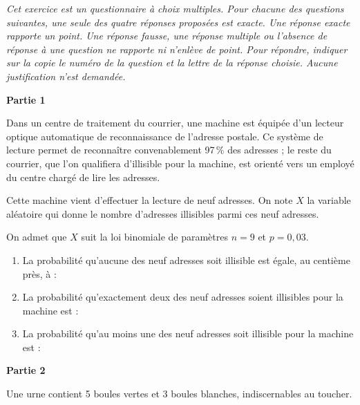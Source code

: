 \emph{Cet exercice est un questionnaire à choix multiples. Pour chacune des questions suivantes, une seule des quatre réponses proposées est exacte. Une réponse exacte rapporte un point. Une réponse fausse, une réponse multiple ou l’absence de réponse à une question ne rapporte ni n’enlève de point. Pour répondre, indiquer sur la copie le numéro de la question et la lettre de la réponse choisie. Aucune justification n’est demandée.}

\medskip

\textbf{Partie 1}

\medskip

Dans un centre de traitement du courrier, une machine est équipée d’un lecteur optique automatique de reconnaissance de l’adresse postale. Ce système de lecture permet de reconnaître convenablement 97\,\% des adresses ; le reste du courrier, que l’on qualifiera d’illisible pour la machine, est orienté vers un employé du centre chargé de lire les adresses.

Cette machine vient d’effectuer la lecture de neuf adresses. On note $X$ la variable aléatoire qui donne le nombre d’adresses illisibles parmi ces neuf adresses. 

On admet que $X$ suit la loi binomiale de paramètres $n=9$ et $p=0,03$.

\begin{enumerate}
	\item La probabilité qu’aucune des neuf adresses soit illisible est égale, au centième près, à :
	
	\item La probabilité qu’exactement deux des neuf adresses soient illisibles pour la machine est :
	
	\item La probabilité qu’au moins une des neuf adresses soit illisible pour la machine est :
	
\end{enumerate}

\medskip

\textbf{Partie 2}

\medskip

Une urne contient 5 boules vertes et 3 boules blanches, indiscernables au toucher.

